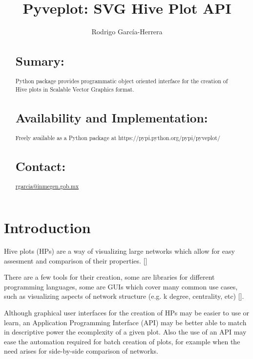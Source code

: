 \documentclass{bioinfo}
\begin{document}

\title[short Title]{Pyveplot: SVG Hive Plot API}
\author[]{Rodrigo Garc\'ia-Herrera}
\address{Department of Bioinformatics, National Institute of Genomic
  Medicine, Periferico Sur 4809, Mexico City 14610}



\maketitle

\begin{abstract}

\section{Sumary:}
Python package provides programmatic object oriented interface for the
creation of Hive plots in Scalable Vector Graphics format.
\section{Availability and Implementation:}
Freely available as a Python package at
https://pypi.python.org/pypi/pyveplot/

\section{Contact:} \href{rgarcia@inmegen.gob.mx}{rgarcia@inmegen.gob.mx}
\end{abstract}

\section{Introduction}

Hive plots (HPs) are a way of visualizing large networks which allow
for easy assesment and comparison of their properties.
[\cite{krzywinski2012hive}]

There are a few tools for their creation, some are libraries for
different programming languages, some are GUIs which cover many common
use cases, such as visualizing aspects of network structure (e.g. k
degree, centrality, etc) [\cite{jhive}].

Although graphical user interfaces for the creation of HPs may be
easier to use or learn, an Application Programming Interface (API) may
be better able to match in descriptive power the ecomplexity of a
given plot. Also the use of an API may ease the automation required
for batch creation of plots, for example when the need arises for
side-by-side comparison of networks.
\end{document}
